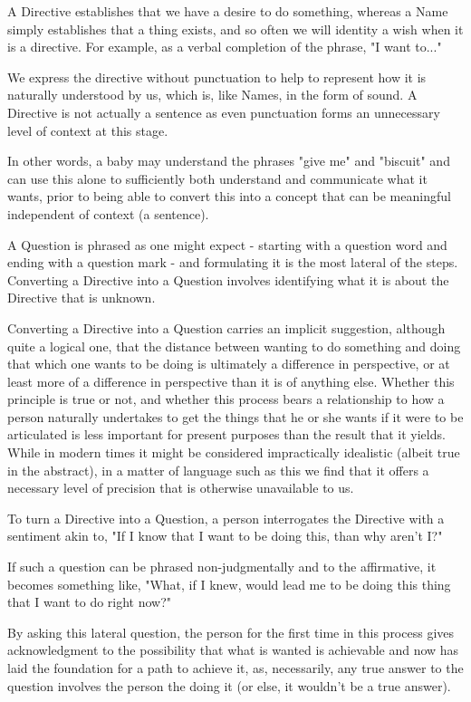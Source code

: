 \documentclass{article}
\begin{document}
\begin{multicols}{2}
A Directive establishes that we have a desire to do something, whereas a Name simply establishes that a thing exists, and so often we will identity a wish when it is a directive. For example, as a verbal completion of the phrase, "I want to..."

We express the directive without punctuation to help to represent how it is naturally understood by us, which is, like Names, in the form of sound. A Directive is not actually a sentence as even punctuation forms an unnecessary level of context at this stage.

In other words, a baby may understand the phrases "give me" and "biscuit" and can use this alone to sufficiently both understand and communicate what it wants, prior to being able to convert this into a concept that can be meaningful independent of context (a sentence).

A Question is phrased as one might expect - starting with a question word and ending with a question mark - and formulating it is the most lateral of the steps. Converting a Directive into a Question involves identifying what it is about the Directive that is unknown.

Converting a Directive into a Question carries an implicit suggestion, although quite a logical one, that the distance between wanting to do something and doing that which one wants to be doing is ultimately a difference in perspective, or at least more of a difference in perspective than it is of anything else. Whether this principle is true or not, and whether this process bears a relationship to how a person naturally undertakes to get the things that he or she wants if it were to be articulated is less important for present purposes than the result that it yields. While in modern times it might be considered impractically idealistic (albeit true in the abstract), in a matter of language such as this we find that it offers a necessary level of precision that is otherwise unavailable to us.

To turn a Directive into a Question, a person interrogates the Directive with a sentiment akin to, "If I know that I want to be doing this, than why aren't I?"

If such a question can be phrased non-judgmentally and to the affirmative, it becomes something like, "What, if I knew, would lead me to be doing this thing that I want to do right now?"

By asking this lateral question, the person for the first time in this process gives acknowledgment to the possibility that what is wanted is achievable and now has laid the foundation for a path to achieve it, as, necessarily, any true answer to the question involves the person the doing it (or else, it wouldn't be a true answer).


\end{multicols}
\end{document}
